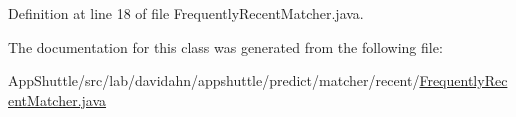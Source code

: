 \-Definition at line 18 of file \-Frequently\-Recent\-Matcher.\-java.



\-The documentation for this class was generated from the following file\-:\begin{DoxyCompactItemize}
\item 
\-App\-Shuttle/src/lab/davidahn/appshuttle/predict/matcher/recent/\hyperlink{_frequently_recent_matcher_8java}{\-Frequently\-Recent\-Matcher.\-java}\end{DoxyCompactItemize}
